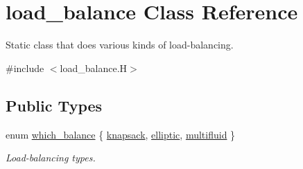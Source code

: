 \hypertarget{classload__balance}{}\section{load\+\_\+balance Class Reference}
\label{classload__balance}


Static class that does various kinds of load-\/balancing.  




{\ttfamily \#include $<$load\+\_\+balance.\+H$>$}

\subsection*{Public Types}
\begin{DoxyCompactItemize}
\item 
enum \hyperlink{classload__balance_aeda8ae1759629dfa65e6691678d0b3b9}{which\+\_\+balance} \{ \hyperlink{classload__balance_aeda8ae1759629dfa65e6691678d0b3b9a4aa96cf41f89612ecbeac1c49d1df0eb}{knapsack}, 
\hyperlink{classload__balance_aeda8ae1759629dfa65e6691678d0b3b9a7957e03542e3e768202452e40070034c}{elliptic}, 
\hyperlink{classload__balance_aeda8ae1759629dfa65e6691678d0b3b9a364252b3fa3eb865b807bce5e8c416f7}{multifluid}
 \}\begin{DoxyCompactList}\small\item\em Load-\/balancing types. \end{DoxyCompactList}
\end{DoxyCompactItemize}
